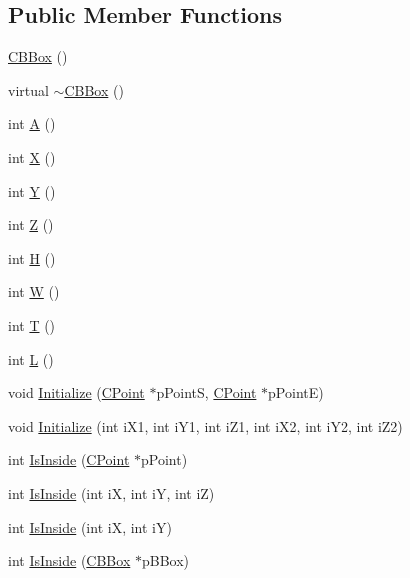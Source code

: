 \subsection*{Public Member Functions}
\begin{DoxyCompactItemize}
\item 
\mbox{\hyperlink{classCBBox_af10fa7fdae936cedadfdb8024a3ea9ec}{C\+B\+Box}} ()
\item 
virtual \mbox{\hyperlink{classCBBox_a5c0f90935c24137442e517a96fb6086e}{$\sim$\+C\+B\+Box}} ()
\item 
int \mbox{\hyperlink{classCBBox_ae53a02f449d2af63fe2fbf20c77df560}{A}} ()
\item 
int \mbox{\hyperlink{classCBBox_a437bb0692398b1bb83d662b68beb0f3e}{X}} ()
\item 
int \mbox{\hyperlink{classCBBox_a5199b3a785f2bd06a53d8cd961c5a749}{Y}} ()
\item 
int \mbox{\hyperlink{classCBBox_a10a28f06a871f587524102491b9ae566}{Z}} ()
\item 
int \mbox{\hyperlink{classCBBox_a4224d61560438a2febb4e7e7323e2b08}{H}} ()
\item 
int \mbox{\hyperlink{classCBBox_a0b95aec1053ef1161c6129d61c8c3144}{W}} ()
\item 
int \mbox{\hyperlink{classCBBox_a4f032d03aa68e110aa31217cd687c417}{T}} ()
\item 
int \mbox{\hyperlink{classCBBox_a8dbcaa755e35418d1c90b1ab3748c0d8}{L}} ()
\item 
void \mbox{\hyperlink{classCBBox_a60eff894d9a143099e91277312a8eb4d}{Initialize}} (\mbox{\hyperlink{classCPoint}{C\+Point}} $\ast$p\+PointS, \mbox{\hyperlink{classCPoint}{C\+Point}} $\ast$p\+PointE)
\item 
void \mbox{\hyperlink{classCBBox_a14455cfc9abfa1c70b1140d03e8afff2}{Initialize}} (int i\+X1, int i\+Y1, int i\+Z1, int i\+X2, int i\+Y2, int i\+Z2)
\item 
int \mbox{\hyperlink{classCBBox_a82263f5b6a58c13943b99140f664ddf0}{Is\+Inside}} (\mbox{\hyperlink{classCPoint}{C\+Point}} $\ast$p\+Point)
\item 
int \mbox{\hyperlink{classCBBox_ab8c8772201f6864c1fdf7a4bb78bdd50}{Is\+Inside}} (int iX, int iY, int iZ)
\item 
int \mbox{\hyperlink{classCBBox_a06176ef2a9c66bd680fe01ec001a7830}{Is\+Inside}} (int iX, int iY)
\item 
int \mbox{\hyperlink{classCBBox_ad00a75c0330ee8138ea4a46b45eb1acb}{Is\+Inside}} (\mbox{\hyperlink{classCBBox}{C\+B\+Box}} $\ast$p\+B\+Box)

\end{DoxyCompactItemize}
